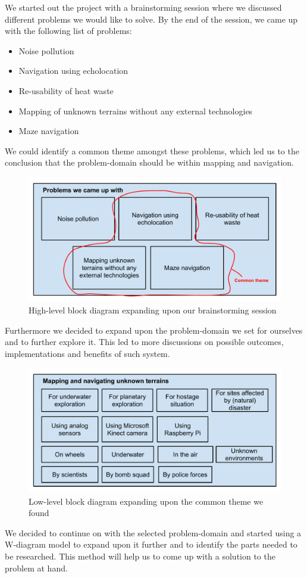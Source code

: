 We started out the project with a brainstorming session where we discussed different problems we would like to solve. By the end of the session, we came up with the following list of problems:
\begin{itemize}
	\item Noise pollution
	\item Navigation using echolocation
	\item Re-usability of heat waste
	\item Mapping of unknown terrains without any external technologies
	\item Maze navigation
\end{itemize}

We could identify a common theme amongst these problems, which led us to the conclusion that the problem-domain should be within mapping and navigation. 

\begin{figure}[!h]
	\centering
	\includegraphics[scale=.7]{images/high-level-block.pdf}
	\caption{High-level block diagram expanding upon our brainstorming session}
	\label{fig:highlevelblock}
\end{figure}

Furthermore we decided to expand upon the problem-domain we set for ourselves and to further explore it. This led to more discussions on possible outcomes, implementations and benefits of such system.

\begin{figure}[!h]
	\centering
	\includegraphics[scale=.7]{images/low-level-block.pdf}
	\caption{Low-level block diagram expanding upon the common theme we found}
	\label{fig:lowlevelblock}
\end{figure}

We decided to continue on with the selected problem-domain and started using a W-diagram model to expand upon it further and to identify the parts needed to be researched. This method will help us to come up with a solution to the problem at hand.